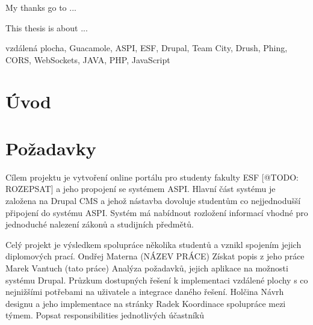 \documentclass[11pt,draft,oneside]{fithesis2}
\begin{document}
\FrontMatter
\ThesisTitlePage

\begin{ThesisDeclaration}
  \DeclarationText
  \AdvisorName
\end{ThesisDeclaration}

\begin{ThesisThanks}
My thanks go to ... 
\end{ThesisThanks}

\begin{ThesisAbstract}
This thesis is about ...
\end{ThesisAbstract}

\begin{ThesisKeyWords}
vzdálená plocha, Guacamole, ASPI, ESF, Drupal, Team City, Drush, Phing, CORS, WebSockets, JAVA, PHP, JavaScript
\end{ThesisKeyWords}


\MainMatter

\tableofcontents

\chapter{Úvod}

\chapter{Požadavky}
Cílem projektu je vytvoření online portálu pro studenty fakulty ESF [@TODO: ROZEPSAT] a jeho propojení se systémem ASPI. %
Hlavní část systému je založena na Drupal CMS a jehož nástavba dovoluje studentům co nejjednodušší připojení do systému ASPI. Systém má nabídnout rozložení informací vhodné pro jednoduché nalezení zákonů a studijních předmětů. 

Celý projekt je výsledkem spolupráce několika studentů a vznikl spojením jejich diplomových prací.
Ondřej Materna (NÁZEV PRÁCE)
Získat popis z jeho práce
Marek Vantuch (tato práce) 
Analýza požadavků, jejich aplikace na možnosti systému Drupal. 
Průzkum dostupných řešení k implementaci vzdálené plochy s co nejnižšími potřebami na uživatele a integrace daného řešení.
Holčina
Návrh designu a jeho implementace na stránky
Radek 
Koordinace spolupráce mezi týmem.
Popsat responsibilities jednotlivých účastníků
\end{document}
